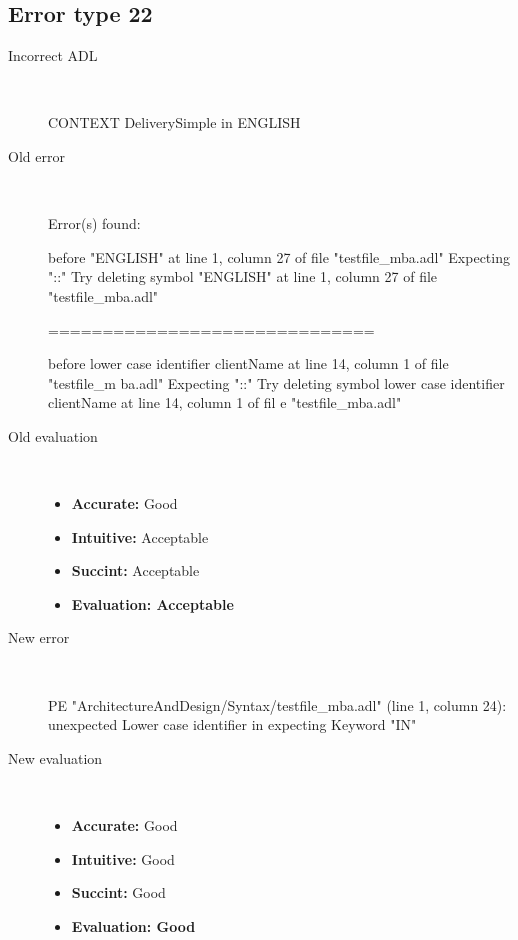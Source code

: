 \hrulefill

\subsection{Error type 22}
  \begin{description}
  \item[Incorrect ADL]~\\
\begin{adl}
CONTEXT DeliverySimple in ENGLISH\end{adl}
  \item[Old error]~\\
\begin{haskell}
Error(s) found:

before "ENGLISH" at line 1, column 27 of file "testfile_mba.adl"
Expecting "::"
Try deleting symbol "ENGLISH" at line 1, column 27 of file "testfile_mba.adl"

==============================

before lower case identifier clientName at line 14, column 1 of file "testfile_m
ba.adl"
Expecting "::"
Try deleting symbol lower case identifier clientName at line 14, column 1 of fil
e "testfile_mba.adl"\end{haskell}
  \item[Old evaluation]~\\
    \begin{itemize}
    \item \textbf{Accurate:} Good
    \item \textbf{Intuitive:} Acceptable
    \item \textbf{Succint:} Acceptable
    \item \textbf{Evaluation: Acceptable}
    \end{itemize}
  \item[New error]~\\
\begin{haskell}
PE "ArchitectureAndDesign/Syntax/testfile_mba.adl" (line 1, column 24):
unexpected Lower case identifier in
expecting Keyword "IN"\end{haskell}
  \item[New evaluation]~\\
    \begin{itemize}
    \item \textbf{Accurate:} Good
    \item \textbf{Intuitive:} Good
    \item \textbf{Succint:} Good
    \item \textbf{Evaluation: Good
}
    \end{itemize}
  \end{description}


